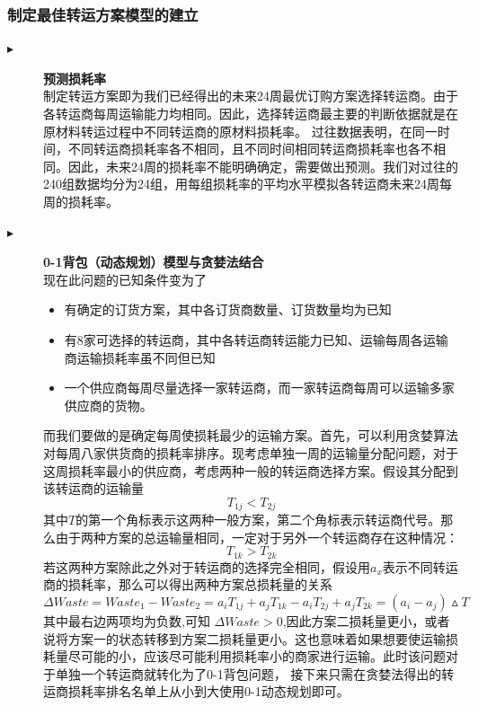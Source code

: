 \documentclass{cumcmthesis}
\begin{document}
\subsubsection*{制定最佳转运方案模型的建立}
\begin{description}
    \item[$\blacktriangleright$]\textbf{预测损耗率}  \\
    制定转运方案即为我们已经得出的未来24周最优订购方案选择转运商。由于各转运商每周运输能力均相同。因此，选择转运商最主要的判断依据就是在原材料转运过程中不同转运商的原材料损耗率。
    过往数据表明，在同一时间，不同转运商损耗率各不相同，且不同时间相同转运商损耗率也各不相同。因此，未来24周的损耗率不能明确确定，需要做出预测。我们对过往的240组数据均分为24组，用每组损耗率的平均水平模拟各转运商未来24周每周的损耗率。
    \item[$\blacktriangleright$]\textbf{0-1背包（动态规划）模型与贪婪法结合}\\
    现在此问题的已知条件变为了
    \begin{itemize}
        \item 有确定的订货方案，其中各订货商数量、订货数量均为已知
        \item 有8家可选择的转运商，其中各转运商转运能力已知、运输每周各运输商运输损耗率虽不同但已知
        \item 一个供应商每周尽量选择一家转运商，而一家转运商每周可以运输多家供应商的货物。
    \end{itemize}
    而我们要做的是确定每周使损耗最少的运输方案。首先，可以利用贪婪算法对每周八家供货商的损耗率排序。现考虑单独一周的运输量分配问题，对于这周损耗率最小的供应商，考虑两种一般的转运商选择方案。假设其分配到该转运商的运输量
    \begin{equation}
        T_{1j}<T_{2j}\nonumber
    \end{equation}
    其中$T$的第一个角标表示这两种一般方案，第二个角标表示转运商代号。那么由于两种方案的总运输量相同，一定对于另外一个转运商存在这种情况：
    \begin{equation}
        T_{1k}>T_{2k}\nonumber
    \end{equation}
    若这两种方案除此之外对于转运商的选择完全相同，假设用$a_{x}$表示不同转运商的损耗率，那么可以得出两种方案总损耗量的关系
    \begin{equation}
        \Delta Waste= Waste_1-Waste_2=a_i T_{1j}+ a_j T_{1k}-a_i T_{2j} + a_j T_{2k}=(a_i-a_j)\vartriangle T\nonumber
    \end{equation}
    其中最右边两项均为负数,可知 $\Delta Waste >0$,因此方案二损耗量更小，或者说将方案一的状态转移到方案二损耗量更小。这也意味着如果想要使运输损耗量尽可能的小，应该尽可能利用损耗率小的商家进行运输。此时该问题对于单独一个转运商就转化为了0-1背包问题，
    接下来只需在贪婪法得出的转运商损耗率排名名单上从小到大使用0-1动态规划即可。
\end{description}
\end{document}
